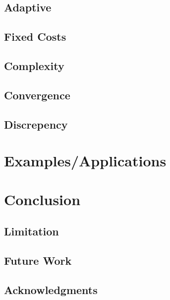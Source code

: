 \documentclass[acmtoms]{doc_acmtrans2m}
\begin{document}
\subsection{Adaptive}

\subsection{Fixed Costs}

\subsection{Complexity}

\subsection{Convergence}

\subsection{Discrepency} 


\section{Examples/Applications}
\label{sec:ex}
  
  
\section{Conclusion}
\label{sec:con}

 
\subsection{Limitation}

 
\subsection{Future Work}


\frenchspacing




 
\subsection*{Acknowledgments}
  

{\small }
\end{document}
